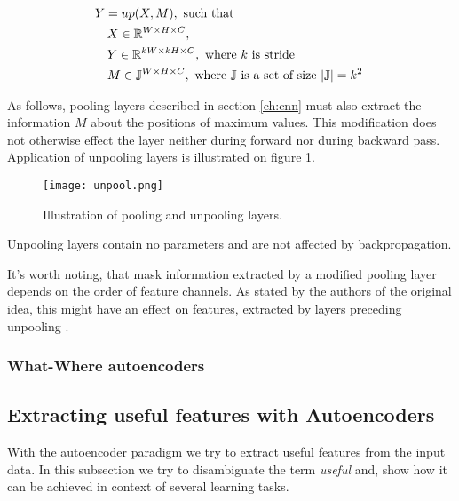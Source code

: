\begin{equation}\label{eq:unp}
  \begin{aligned}
    & Y = up(X, M),\text{ such that} \\
    & \quad X \in \Bbb{R}^{W \times H \times C}, \\
    & \quad Y \in \Bbb{R}^{kW \times kH \times C}, \text{ where $k$ is stride } \\
    & \quad M \in \Bbb{J}^{W \times H \times C}, \text{ where $\Bbb{J}$ is a set of size $|\Bbb{J}|=k^2$ }
  \end{aligned}
\end{equation}

As follows, pooling layers described in section \ref{ch:cnn} must also extract the information $M$ about the positions of maximum values. This modification does not otherwise effect the layer neither during forward nor during backward pass. Application of unpooling layers is illustrated on figure \ref{fig:unpool}.

\begin{figure}[h!]
  \centering
    \texttt{[image: unpool.png]}
  \caption{Illustration of pooling and unpooling layers.}
  \label{fig:unpool}
\end{figure}

Unpooling layers contain no parameters and are not affected by backpropagation.

It's worth noting, that mask information extracted by a modified pooling layer depends on the order of feature channels. As stated by the authors of the original idea, this might have an effect on features, extracted by layers preceding unpooling \cite{Zhao2015}.

\subsubsection{What-Where autoencoders}



\subsection{Extracting useful features with Autoencoders}\label{ch:mod_ae}

With the autoencoder paradigm we try to extract useful features from the input data. In this subsection we try to disambiguate the term \textit{useful} and, show how it can be achieved in context of several learning tasks.

